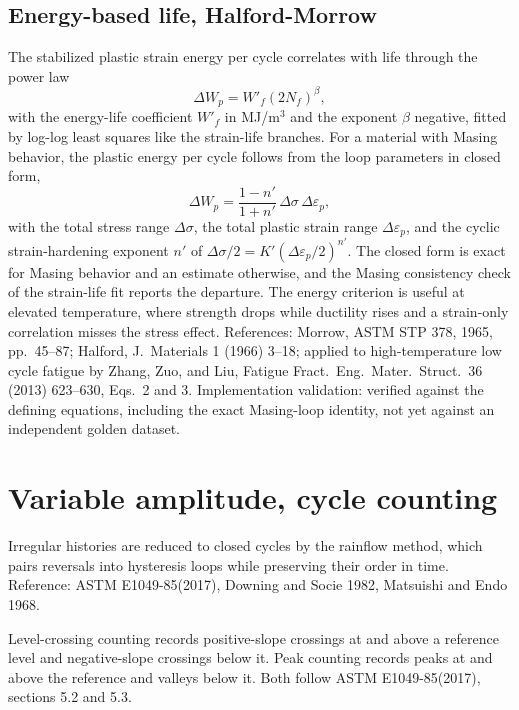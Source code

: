 \documentclass[11pt]{article}
\begin{document}
\subsection{Energy-based life, Halford-Morrow}
The stabilized plastic strain energy per cycle correlates with life through
the power law
\begin{equation}
\Delta W_p = W'_f \left(2N_f\right)^{\beta},
\end{equation}
with the energy-life coefficient \(W'_f\) in MJ/m\(^3\) and the exponent
\(\beta\) negative, fitted by log-log least squares like the strain-life
branches. For a material with Masing behavior, the plastic energy per cycle
follows from the loop parameters in closed form,
\begin{equation}
\Delta W_p = \frac{1 - n'}{1 + n'}\,\Delta\sigma\,\Delta\varepsilon_p,
\end{equation}
with the total stress range \(\Delta\sigma\), the total plastic strain range
\(\Delta\varepsilon_p\), and the cyclic strain-hardening exponent \(n'\) of
\(\Delta\sigma/2 = K'\left(\Delta\varepsilon_p/2\right)^{n'}\). The closed
form is exact for Masing behavior and an estimate otherwise, and the Masing
consistency check of the strain-life fit reports the departure. The energy
criterion is useful at elevated temperature, where strength drops while
ductility rises and a strain-only correlation misses the stress effect.
References: Morrow, ASTM STP 378, 1965, pp.\ 45--87; Halford, J.\ Materials
1 (1966) 3--18; applied to high-temperature low cycle fatigue by Zhang, Zuo,
and Liu, Fatigue Fract.\ Eng.\ Mater.\ Struct.\ 36 (2013) 623--630, Eqs.\ 2
and 3. Implementation validation: verified against the defining equations,
including the exact Masing-loop identity, not yet against an independent
golden dataset.

\section{Variable amplitude, cycle counting}
Irregular histories are reduced to closed cycles by the rainflow method, which
pairs reversals into hysteresis loops while preserving their order in time.
Reference: ASTM E1049-85(2017), Downing and Socie 1982, Matsuishi and Endo 1968.

Level-crossing counting records positive-slope crossings at and above a
reference level and negative-slope crossings below it. Peak counting records
peaks at and above the reference and valleys below it. Both follow ASTM
E1049-85(2017), sections 5.2 and 5.3.
\end{document}
